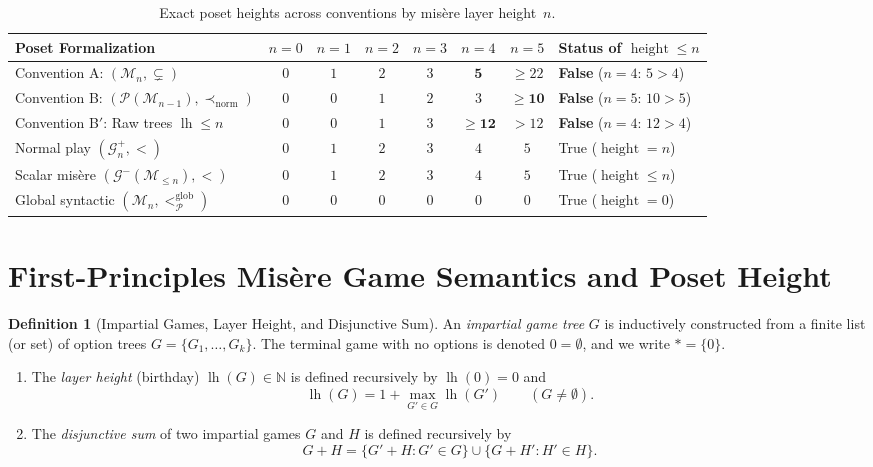\documentclass[11pt]{amsart}
\theoremstyle{definition}
\newtheorem{definition}[theorem]{Definition}
\theoremstyle{remark}
\newcommand{\Ppos}{\mathcal{P}}
\newcommand{\Mlayer}{\mathcal{M}}
\newcommand{\Glayer}{\mathcal{G}}
\DeclareMathOperator{\lh}{lh}
\DeclareMathOperator{\height}{height}
\begin{document}
\begin{table}[ht]
\centering
\caption{Exact poset heights across conventions by mis\`ere layer height~$n$.}
\label{tab:summary}
\small
\begin{tabular}{@{}lccccccl@{}}
\toprule
Poset Formalization & $n=0$ & $n=1$ & $n=2$ & $n=3$ & $n=4$ & $n=5$ & Status of $\height \le n$ \\
\midrule
Convention A: $(\Mlayer_n, \subsetneq)$ & $0$ & $1$ & $2$ & $3$ & $\mathbf{5}$ & $\ge 22$ & \textbf{False} ($n=4$: $5 > 4$) \\
Convention B: $(\mathcal{P}(\Mlayer_{n-1}), \prec_{\mathrm{norm}})$ & $0$ & $0$ & $1$ & $2$ & $3$ & $\mathbf{\ge 10}$ & \textbf{False} ($n=5$: $10 > 5$) \\
Convention B$'$: Raw trees $\lh \le n$ & $0$ & $0$ & $1$ & $3$ & $\mathbf{\ge 12}$ & $> 12$ & \textbf{False} ($n=4$: $12 > 4$) \\
\midrule
Normal play $(\Glayer_n^+, <)$ & $0$ & $1$ & $2$ & $3$ & $4$ & $5$ & True ($\height = n$) \\
Scalar mis\`ere $(\Glayer^-(\Mlayer_{\le n}), <)$ & $0$ & $1$ & $2$ & $3$ & $4$ & $5$ & True ($\height \le n$) \\
Global syntactic $(\Mlayer_n, <_{\Ppos}^{\mathrm{glob}})$ & $0$ & $0$ & $0$ & $0$ & $0$ & $0$ & True ($\height = 0$) \\
\bottomrule
\end{tabular}
\end{table}

\section{First-Principles Mis\`ere Game Semantics and Poset Height}

\begin{definition}[Impartial Games, Layer Height, and Disjunctive Sum]
An \emph{impartial game tree} $G$ is inductively constructed from a finite list (or set) of option trees $G = \{G_1, \dots, G_k\}$. The terminal game with no options is denoted $0 = \emptyset$, and we write $* = \{0\}$.
\begin{enumerate}
  \item The \emph{layer height} (birthday) $\lh(G) \in \mathbb{N}$ is defined recursively by $\lh(0) = 0$ and
  \[
    \lh(G) = 1 + \max_{G' \in G} \lh(G') \qquad (G \neq \emptyset).
  \]
  \item The \emph{disjunctive sum} of two impartial games $G$ and $H$ is defined recursively by
  \[
    G + H = \{G' + H : G' \in G\} \cup \{G + H' : H' \in H\}.
  \]
\end{enumerate}
\end{definition}
\end{document}
